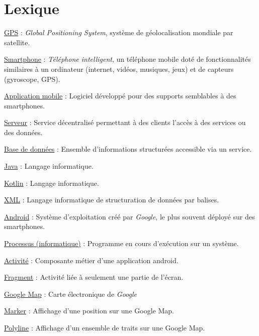 \section{Lexique}

\underline{GPS} : \emph{Global Positioning System}, système de géolocalisation mondiale par satellite.

\vspace{10pt}
\underline{Smartphone} : \emph{Téléphone intelligent}, un téléphone mobile doté de fonctionnalités similaires
à un ordinateur (internet, vidéos, musiques, jeux) et de capteurs (gyroscope, GPS).

\vspace{10pt}
\underline{Application mobile} : Logiciel développé pour des supports semblables à des smartphones.

\vspace{10pt}
\underline{Serveur} : Service décentralisé permettant à des clients l'accès à des services ou des données.

\vspace{10pt}
\underline{Base de données} : Ensemble d'informations structurées accessible via un service.

\vspace{10pt}
\underline{Java} : Langage informatique.

\vspace{10pt}
\underline{Kotlin} : Langage informatique.

\vspace{10pt}
\underline{XML} : Langage informatique de structuration de données par balises.

\vspace{10pt}
\underline{Android} : Système d'exploitation créé par \emph{Google}, le plus souvent déployé sur des smartphones.

\vspace{10pt}
\underline{Processus (informatique)} : Programme en cours d'exécution sur un système.

\vspace{10pt}
\underline{Activité} : Composante métier d'une application android.

\vspace{10pt}
\underline{Fragment} : Activité liée à seulement une partie de l'écran.

\vspace{10pt}
\underline{Google Map} : Carte électronique de \emph{Google}

\vspace{10pt}
\underline{Marker} : Affichage d'une position sur une Google Map.

\vspace{10pt}
\underline{Polyline} : Affichage d'un ensemble de traits sur une Google Map.

